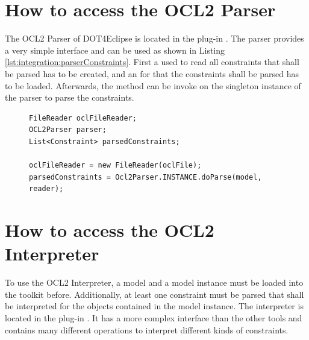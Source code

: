 \section{How to access the OCL2 Parser}

The \acs{OCL}2 Parser of \acl{DOT4Eclipse} is located in the plug-in . The parser provides a very simple interface and can be used as shown in Listing \ref{lst:integration:parserConstraints}. First a  used to read all constraints that shall be parsed has to be created, and an  for that the constraints shall be parsed has to be loaded. Afterwards, the method  can be invoke on the singleton instance of the parser to parse the constraints.

\begin{figure}[!b]
\begin{lstlisting}[caption={How to parse constraints.}, captionpos=b, label=lst:integration:parserConstraints]
FileReader oclFileReader;
OCL2Parser parser;
List<Constraint> parsedConstraints;

oclFileReader = new FileReader(oclFile);
parsedConstraints = Ocl2Parser.INSTANCE.doParse(model, reader);
\end{lstlisting}
\end{figure}



\section{How to access the OCL2 Interpreter}

To use the \acs{OCL}2 Interpreter, a model and a model instance must be loaded into the toolkit before. Additionally, at least one constraint must be parsed that shall be interpreted for the objects contained in the model instance. The interpreter is located in the plug-in . It has a more complex interface than the other tools and contains many different operations to interpret different kinds of constraints.

